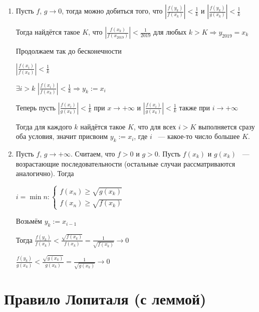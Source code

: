 \documentclass{article}
\begin{document}
			\begin{enumerate}
			
				\item Пусть $f$, $g \rightarrow 0$, тогда можно добиться того, что $\left| \frac{f(y_k)}{f(x_k)} \right| < \frac{1}{k}$ и $\left| \frac{f(y_k)}{g(x_k)} \right| < \frac{1}{k}$
			
					Тогда найдётся такое $K$, что $\left| \frac{f(x_k)}{f(x_{2019})} \right| < \frac{1}{2019}$ для любых $k > K \Rightarrow y_{2019} = x_k$
			
					Продолжаем так до бесконечности
			
					$\left| \frac{f(x_i)}{f(x_k)} \right| < \frac{1}{k}$
			
					$\exists i > k$ $\left| \frac{f(x_i)}{f(x_k)} \right| < \frac{1}{k} \Rightarrow y_k := x_i$

					Теперь пусть $\left| \frac{f(x_i)}{g(x_k)} \right| < \frac{1}{k}$ при $x \rightarrow +\infty$ и $\left| \frac{f(x_i)}{g(x_k)} \right| < \frac{1}{k}$ также при $i \rightarrow +\infty$
			
					Тогда для каждого $k$ найдётся такое $K$, что для всех $i > K$ выполняется сразу оба условия, значит присвоим $y_k := x_i$, где $i$ ~--- какое-то число большее $K$.
		
				\item Пусть $f$, $g \rightarrow +\infty$. Считаем, что $f > 0$ и $g > 0$. Пусть $f(x_k)$ и $g(x_k)$ ~--- возрастающие последовательности (остальные случаи рассматриваются аналогично). Тогда
				
					$i = \min n: \begin{cases} f(x_n) \geq \sqrt{g(x_k)} \\ f(x_n) \geq \sqrt{f(x_k)} \end{cases}$
					
					Возьмём $y_k := x_{i - 1}$
					
					Тогда $\frac{f(y_k)}{f(x_k)} < \frac{\sqrt{f(x_k)}}{f(x_k)} = \frac{1}{\sqrt{f(x_k)}} \rightarrow 0$
					
						$\frac{f(y_k)}{g(x_k)} < \frac{\sqrt{g(x_k)}}{g(x_k)}= \frac{1}{\sqrt{g(x_k)}} \rightarrow 0$
					
			\end{enumerate}	
			
	\newpage
	
	\section{Правило Лопиталя (с леммой)}
	
\end{document}
